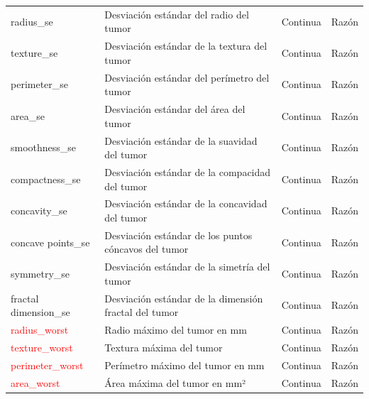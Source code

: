 \documentclass[a4paper, 12pt]{article}
\begin{document}
\begin{table}[ht]
{\begin{tabular}{|p{3.5cm}|p{5.5cm}|p{3.5cm}|p{3.5cm}|}
            radius\_se & Desviación estándar del radio del tumor & Continua & Razón \\
            
            texture\_se & Desviación estándar de la textura del tumor & Continua & Razón \\
            
            perimeter\_se & Desviación estándar del perímetro del tumor & Continua & Razón \\
            
            area\_se & Desviación estándar del área del tumor & Continua & Razón \\
            
            smoothness\_se & Desviación estándar de la suavidad del tumor & Continua & Razón \\
            
            compactness\_se & Desviación estándar de la compacidad del tumor & Continua & Razón \\
            
            concavity\_se & Desviación estándar de la concavidad del tumor & Continua & Razón \\
            
            concave points\_se & Desviación estándar de los puntos cóncavos del tumor & Continua & Razón \\
            
            symmetry\_se & Desviación estándar de la simetría del tumor & Continua & Razón \\
            
            fractal dimension\_se & Desviación estándar de la dimensión fractal del tumor & Continua & Razón \\
            
            \textcolor{red}{radius\_worst} & Radio máximo del tumor en mm & Continua & Razón \\
            
            \textcolor{red}{texture\_worst} & Textura máxima del tumor & Continua & Razón \\
            
            \textcolor{red}{perimeter\_worst} & Perímetro máximo del tumor en mm & Continua & Razón \\
            
            \textcolor{red}{area\_worst} & Área máxima del tumor en mm² & Continua & Razón \\
            

\end{tabular}}
\end{table}
\end{document}
